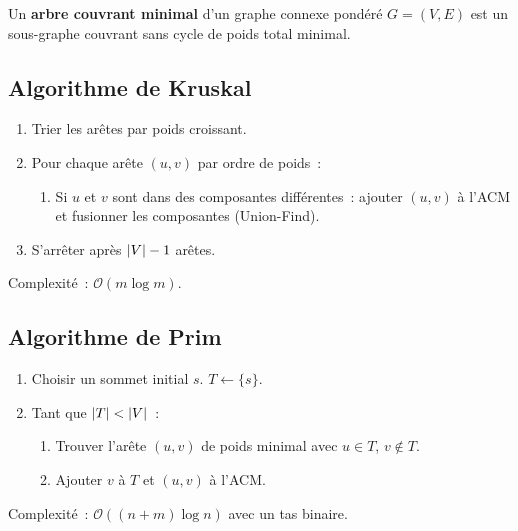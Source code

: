 \begin{definition}
Un \textbf{arbre couvrant minimal} d'un graphe connexe pond\'er\'e $G = (V, E)$
est un sous-graphe couvrant sans cycle de poids total minimal.
\end{definition}

\subsection{Algorithme de Kruskal}

\begin{algorithme}[title=\textbf{Kruskal}]
\begin{enumerate}
  \item Trier les ar\^etes par poids croissant.
  \item Pour chaque ar\^ete $(u,v)$ par ordre de poids~:
    \begin{enumerate}
      \item Si $u$ et $v$ sont dans des composantes diff\'erentes~:
            ajouter $(u,v)$ \`a l'ACM et fusionner les composantes
            (Union-Find).
    \end{enumerate}
  \item S'arr\^eter apr\`es $\left| V \right| - 1$ ar\^etes.
\end{enumerate}
Complexit\'e~: $\mathcal{O}(m \log m)$.
\end{algorithme}

\subsection{Algorithme de Prim}

\begin{algorithme}[title=\textbf{Prim}]
\begin{enumerate}
  \item Choisir un sommet initial $s$.  $T \leftarrow \{s\}$.
  \item Tant que $\left| T \right| < \left| V \right|$~:
    \begin{enumerate}
      \item Trouver l'ar\^ete $(u,v)$ de poids minimal avec $u \in T$,
            $v \notin T$.
      \item Ajouter $v$ \`a $T$ et $(u,v)$ \`a l'ACM.
    \end{enumerate}
\end{enumerate}
Complexit\'e~: $\mathcal{O}((n + m) \log n)$ avec un tas binaire.
\end{algorithme}

